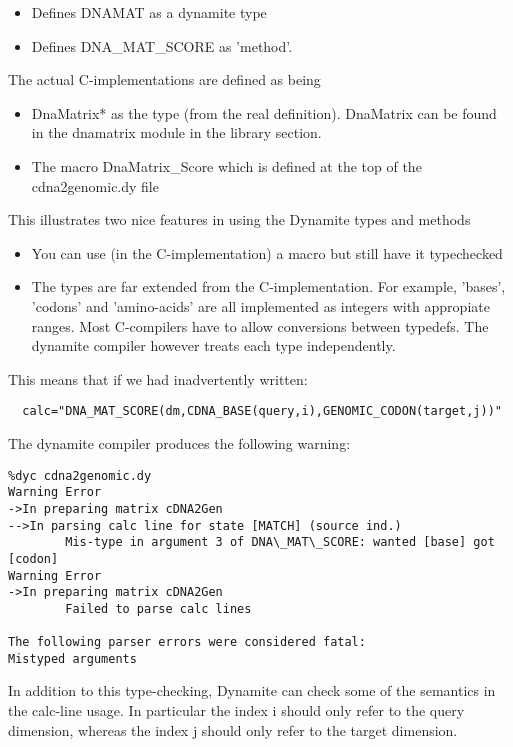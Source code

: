 \begin{itemize}
\item Defines DNAMAT as a dynamite type
\item Defines DNA\_MAT\_SCORE as 'method'.
\end{itemize}

The actual C-implementations are defined as being

\begin{itemize}
\item DnaMatrix* as the type (from the real definition). DnaMatrix can be found in  the dnamatrix module in the library section.
\item The macro DnaMatrix\_Score which is defined at the top of the cdna2genomic.dy file
\end{itemize}

This illustrates two nice features in using the Dynamite types and methods

\begin{itemize}
\item You can use (in the C-implementation) a macro but still have it typechecked 
\item The types are far extended from the C-implementation. For example, 
 'bases', 'codons' and 'amino-acids' are all implemented as integers with 
 appropiate ranges. Most C-compilers have to allow conversions between 
 typedefs. The dynamite compiler however treats each type independently.
\end{itemize}

This means that if we had inadvertently written:

\begin{verbatim}
  calc="DNA_MAT_SCORE(dm,CDNA_BASE(query,i),GENOMIC_CODON(target,j))"
\end{verbatim}

The dynamite compiler produces the following warning:

\begin{verbatim}
%dyc cdna2genomic.dy
Warning Error
->In preparing matrix cDNA2Gen
-->In parsing calc line for state [MATCH] (source ind.)
        Mis-type in argument 3 of DNA\_MAT\_SCORE: wanted [base] got [codon]
Warning Error
->In preparing matrix cDNA2Gen
        Failed to parse calc lines

The following parser errors were considered fatal:
Mistyped arguments
\end{verbatim}

In addition to this type-checking, Dynamite can check some of the semantics
in the calc-line usage. In particular the index i should only refer to
the query dimension, whereas the index j should only refer to the target
dimension.

